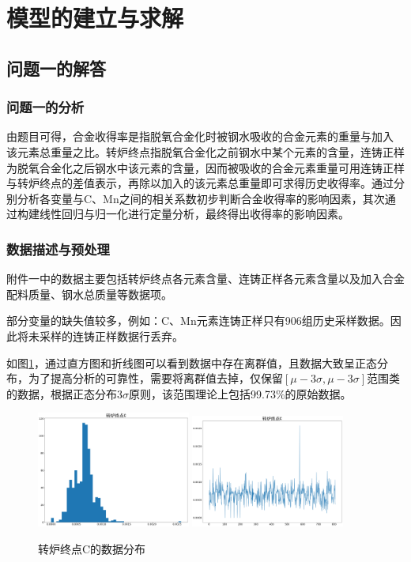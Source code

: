 \documentclass{xcumcmart}
\begin{document}
\section{模型的建立与求解}
\subsection{问题一的解答}
\subsubsection{问题一的分析}
\par 由题目可得，合金收得率是指脱氧合金化时被钢水吸收的合金元素的重量与加入 该元素总重量之比。转炉终点指脱氧合金化之前钢水中某个元素的含量，连铸正样为脱氧合金化之后钢水中该元素的含量，因而被吸收的合金元素重量可用连铸正样与转炉终点的差值表示，再除以加入的该元素总重量即可求得历史收得率。通过分别分析各变量与C、Mn之间的相关系数初步判断合金收得率的影响因素，其次通过构建线性回归与归一化进行定量分析，最终得出收得率的影响因素。
\subsubsection{数据描述与预处理}
\par 附件一中的数据主要包括转炉终点各元素含量、连铸正样各元素含量以及加入合金配料质量、钢水总质量等数据项。
\par 部分变量的缺失值较多，例如：C、Mn元素连铸正样只有906组历史采样数据。因此将未采样的连铸正样数据行丢弃。
\par 如图\ref{fig:prev}，通过直方图和折线图可以看到数据中存在离群值，且数据大致呈正态分布，为了提高分析的可靠性，需要将离群值去掉，仅保留$[\mu-3\sigma,\mu-3\sigma]$范围类的数据，根据正态分布3$\sigma$原则，该范围理论上包括99.73\%的原始数据。
\begin{figure}[htbp]
	\centering
	\includegraphics[width=0.45\textwidth]{fig/hist.png}
	\includegraphics[width=0.45\textwidth]{fig/index.png}
	\caption{转炉终点C的数据分布\label{fig:prev}}
\end{figure}
\end{document}
